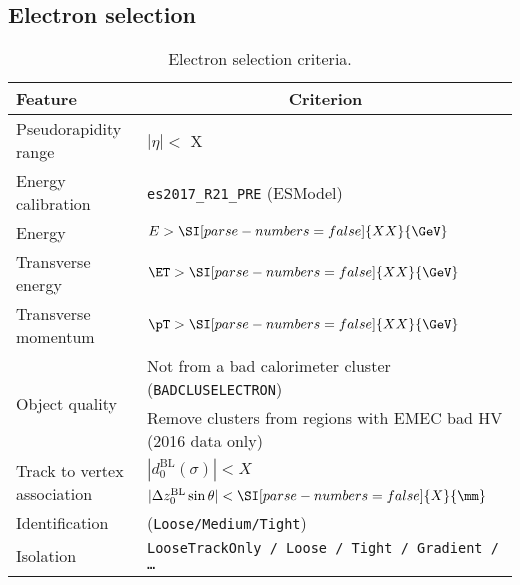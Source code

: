 \subsection{Electron selection}

\begin{table}[ht]
  \caption{Electron selection criteria.}%
  \label{tab:object:electron}
  \centering
  \begin{tabular}{ll}
    \toprule
    Feature & \multicolumn{1}{c}{Criterion} \\
    \midrule
    Pseudorapidity range & \(|\eta| <\) X\\
    Energy calibration & \texttt{es2017\_R21\_PRE} (ESModel)\\
    Energy & \(E > \SI[parse-numbers=false]{XX}{\GeV}\) \\
    Transverse energy & \(\ET > \SI[parse-numbers=false]{XX}{\GeV}\) \\
    Transverse momentum & \(\pT > \SI[parse-numbers=false]{XX}{\GeV}\) \\
    \midrule
    \multirow{2}{*}{Object quality} & Not from a bad calorimeter cluster (\texttt{BADCLUSELECTRON})\\ %
      & Remove clusters from regions with EMEC bad HV (2016 data only) \\
    \midrule
    \multirow{2}{*}{Track to vertex association} & \(|d_{0}^{\text{BL}}(\sigma)| < X\) \\ %
    & \(|\Delta z_{0}^{\text{BL}} \sin{\theta}| < \SI[parse-numbers=false]{X}{\mm}\) \\
    \midrule
    Identification & (\texttt{Loose/Medium/Tight}) \\
    Isolation & \texttt{LooseTrackOnly / Loose / Tight / Gradient / \ldots} \\
      \bottomrule
  \end{tabular}
\end{table}

